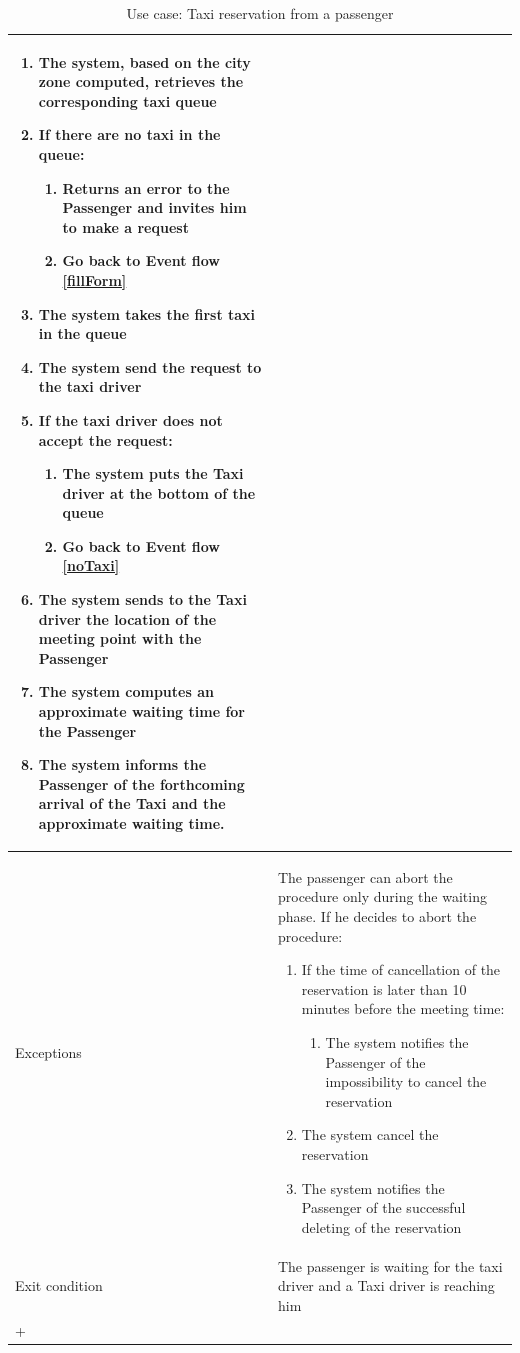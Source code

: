 \begin{center}
\begin{longtable}{| p{} | p{} |}
\begin{enumerate}
			\item The system, based on the city zone computed, retrieves the corresponding taxi queue
			\item If there are no taxi in the queue: \label{noTaxi}
			\begin{enumerate}
				\item Returns an error to the Passenger and invites him to make a request
				\item Go back to Event flow \ref{fillForm}
			\end{enumerate}
			\item The system takes the first taxi in the queue
			\item The system send the request to the taxi driver
			\item If the taxi driver does not accept the request:
			\begin{enumerate}
				\item The system puts the Taxi driver at the bottom of the queue
				\item Go back to Event flow \ref{noTaxi}
			\end{enumerate}
			\item The system sends to the Taxi driver the location of the meeting point with the Passenger
			\item The system computes an approximate waiting time for the Passenger
			\item The system informs the Passenger of the forthcoming arrival of the Taxi and the approximate waiting time.
		\end{enumerate} \\ \hline
		Exceptions & The passenger can abort the procedure only during the	waiting phase. If he decides to abort the procedure:
		\begin{enumerate}
		\item If the time of cancellation of the reservation is later than 10 minutes before the meeting time:
		\begin{enumerate}
			\item The system notifies the Passenger of the impossibility to cancel the reservation
		\end{enumerate}
		\item The system cancel the reservation
		\item The system notifies the Passenger of the successful deleting of the reservation
		\end{enumerate} \\ \hline
Exit condition & The passenger is waiting for the taxi driver and a Taxi driver is reaching him
		\\ \hline
		\caption{Use case: Taxi reservation from a passenger}+
		\label{reserveTaxiUC}
	\end{longtable}
\end{center}


